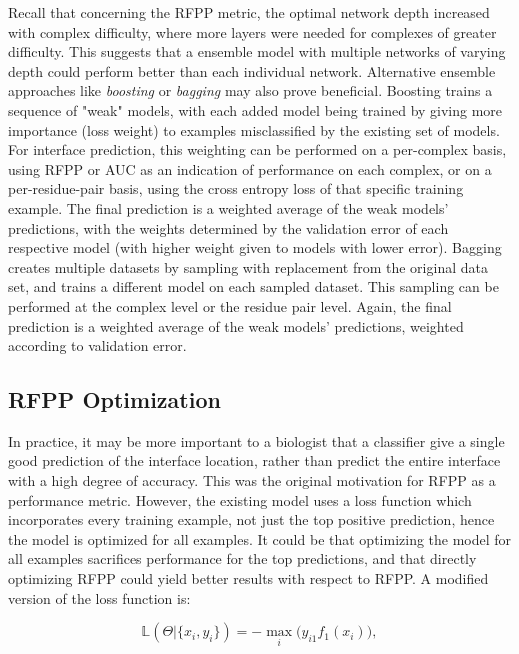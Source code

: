 Recall that concerning the RFPP metric, the optimal network depth increased with complex difficulty, where more layers were needed for complexes of greater difficulty. 
This suggests that a ensemble model with multiple networks of varying depth could perform  better than each individual network.
Alternative ensemble approaches like \emph{boosting} or \emph{bagging} may also prove beneficial.
Boosting trains a sequence of "weak" models, with each added model being trained by giving more importance (loss weight) to examples misclassified by the existing set of models.
For interface prediction, this weighting can be performed on a per-complex basis, using RFPP or AUC as an indication of performance on each complex, or on a per-residue-pair basis, using the cross entropy loss of that specific training example.
The final prediction is a weighted average of the weak models' predictions, with the weights determined by the validation error of each respective model (with higher weight given to models with lower error).
Bagging creates multiple datasets by sampling with replacement from the original data set, and trains a different model on each sampled dataset.
This sampling can be performed at the complex level or the residue pair level.
Again, the final prediction is a weighted average of the weak models' predictions, weighted according to validation error.



\subsection{RFPP Optimization}

In practice, it may be more important to a biologist that a classifier give a single good prediction of the interface location, rather than predict the entire interface with a high degree of accuracy.
This was the original motivation for RFPP as a performance metric.
However, the existing model uses a loss function which incorporates every training example, not just the top positive prediction, hence the model is optimized for all examples.
It could be that optimizing the model for all examples sacrifices performance for the top predictions, and that directly optimizing RFPP could yield better results with respect to RFPP.
A modified version of the loss function is:

\begin{equation}
\mathbb{L}(\Theta | \{x_i, y_i\}) = - \max_{i} \big(y_{i1} f_1(x_i)\big),
\label{eq:rfpp_optimize}
\end{equation}

